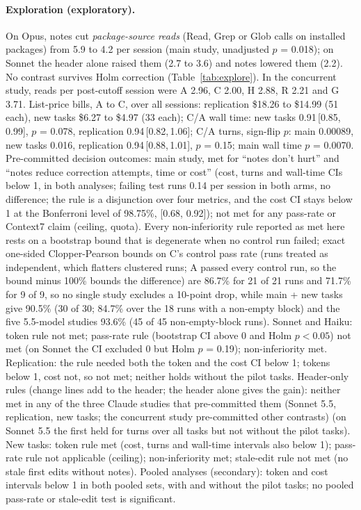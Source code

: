 \documentclass[11pt]{article}
\newcommand{\ci}[2]{\,[#1,\,#2]}
\begin{document}
\paragraph{Exploration (exploratory).}
On Opus, notes cut \emph{package-source reads} (Read, Grep or Glob calls on installed packages) from 5.9 to 4.2 per session (main study, unadjusted $p$ = 0.018); on Sonnet the header alone raised them (2.7 to 3.6) and notes lowered them (2.2). No contrast survives Holm correction (Table~\ref{tab:explore}). In the concurrent study, reads per post-cutoff session were A 2.96, C 2.00, H 2.88, R 2.21 and G 3.71.
List-price bills, A to C, over all sessions: replication \$18.26 to \$14.99 (51 each), new tasks \$6.27 to \$4.97 (33 each); C/A wall time: new tasks 0.91\ci{0.85}{0.99}, $p$ = 0.078, replication 0.94\ci{0.82}{1.06}; C/A turns, sign-flip $p$: main 0.00089, new tasks 0.016, replication 0.94\ci{0.88}{1.01}, $p$ = 0.15; main wall time $p$ = 0.0070.
Pre-committed decision outcomes: main study, met for ``notes don't hurt'' and ``notes reduce correction attempts, time or cost'' (cost, turns and wall-time CIs below 1, in both analyses; failing test runs 0.14 per session in both arms, no difference; the rule is a disjunction over four metrics, and the cost CI stays below 1 at the Bonferroni level of 98.75\%, [0.68, 0.92]); not met for any pass-rate or Context7 claim (ceiling, quota).
Every non-inferiority rule reported as met here rests on a bootstrap bound that is degenerate when no control run failed; exact one-sided Clopper-Pearson bounds on C's control pass rate (runs treated as independent, which flatters clustered runs; A passed every control run, so the bound minus 100\% bounds the difference) are 86.7\% for 21 of 21 runs and 71.7\% for 9 of 9, so no single study excludes a 10-point drop, while main + new tasks give 90.5\% (30 of 30; 84.7\% over the 18 runs with a non-empty block) and the five 5.5-model studies 93.6\% (45 of 45 non-empty-block runs).
Sonnet and Haiku: token rule not met; pass-rate rule (bootstrap CI above 0 and Holm $p<0.05$) not met (on Sonnet the CI excluded 0 but Holm $p$ = 0.19); non-inferiority met.
Replication: the rule needed both the token and the cost CI below 1; tokens below 1, cost not, so not met; neither holds without the pilot tasks.
Header-only rules (change lines add to the header; the header alone gives the gain): neither met in any of the three Claude studies that pre-committed them (Sonnet 5.5, replication, new tasks; the concurrent study pre-committed other contrasts) (on Sonnet 5.5 the first held for turns over all tasks but not without the pilot tasks).
New tasks: token rule met (cost, turns and wall-time intervals also below 1); pass-rate rule not applicable (ceiling); non-inferiority met; stale-edit rule not met (no stale first edits without notes).
Pooled analyses (secondary): token and cost intervals below 1 in both pooled sets, with and without the pilot tasks; no pooled pass-rate or stale-edit test is significant.
\end{document}
